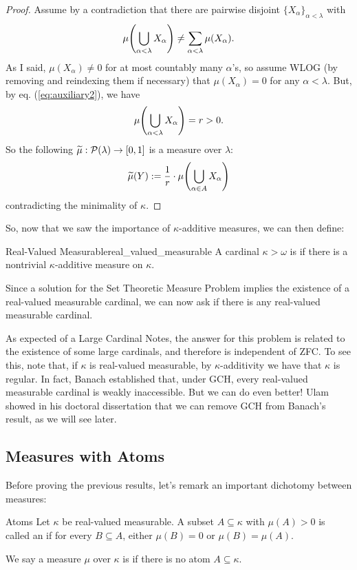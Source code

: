 \begin{proof}
    Assume by a contradiction that there are pairwise disjoint $\{X_\alpha\}_{\alpha<\lambda}$ with
    \begin{equation}\label{eq:auxiliary2}
        \mu{\left(\bigcup_{\alpha<\lambda}X_\alpha\right)}\neq\sum_{\alpha<\lambda}\mu(X_\alpha).
    \end{equation}
    As I said, $\mu(X_\alpha)\neq0$ for at most countably many $\alpha$'s, so assume WLOG (by removing and reindexing them if necessary) that $\mu(X_\alpha)=0$ for any $\alpha<\lambda$. But, by eq. (\ref{eq:auxiliary2}), we have
    $$\mu{\left(\bigcup_{\alpha<\lambda}X_\alpha\right)}=r>0.$$
    So the following $\widetilde{\mu}:\mathcal{P}(\lambda)\to[0,1]$ is a measure over $\lambda$:
    $$\widetilde{\mu}(Y):=\frac1r\cdot \mu{\left(\bigcup_{\alpha\in A}X_\alpha\right)}$$
    contradicting the minimality of $\kappa$.
\end{proof}

So, now that we saw the importance of $\kappa$-additive measures, we can then define:

\begin{definition}{Real-Valued Measurable}{real_valued_measurable}
    A cardinal $\kappa>\omega$ is  if there is a nontrivial $\kappa$-additive measure on $\kappa$.
\end{definition}

Since a solution for the Set Theoretic Measure Problem implies the existence of a real-valued measurable cardinal, we can now ask if there is any real-valued measurable cardinal.

As expected of a Large Cardinal Notes, the answer for this problem is related to the existence of some large cardinals, and therefore is independent of ZFC. To see this, note that, if $\kappa$ is real-valued measurable, by $\kappa$-additivity we have that $\kappa$ is regular. In fact, Banach established that, under GCH, every real-valued measurable cardinal is weakly inaccessible. But we can do even better! Ulam showed in his doctoral dissertation that we can remove GCH from Banach's result, as we will see later.

\subsection{Measures with Atoms}

Before proving the previous results, let's remark an important dichotomy between measures:

\begin{definition}{Atoms}{}
    Let $\kappa$ be real-valued measurable. A subset $A\subseteq\kappa$ with $\mu(A)>0$ is called an  if for every $B\subseteq A$, either $\mu(B)=0$ or $\mu(B)=\mu(A)$.

    We say a measure $\mu$ over $\kappa$ is  if there is no atom $A\subseteq\kappa$.
\end{definition}

